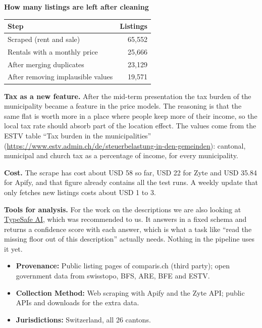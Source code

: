 \documentclass[11pt, a4paper]{article}
\begin{document}
\vspace{0.4em}
\textbf{How many listings are left after cleaning}

\vspace{0.2em}
\begin{center}
\small
\begin{tabular}{lr}
    \toprule
    Step & Listings \\
    \midrule
    Scraped (rent and sale) & 65{,}552 \\
    Rentals with a monthly price & 25{,}666 \\
    After merging duplicates & 23{,}129 \\
    After removing implausible values & 19{,}571 \\
    \bottomrule
\end{tabular}
\end{center}

\vspace{0.4em}
\textbf{Tax as a new feature.} After the mid-term presentation the tax burden of the municipality became a feature in the price models. The reasoning is that the same flat is worth more in a place where people keep more of their income, so the local tax rate should absorb part of the location effect. The values come from the ESTV table ``Tax burden in the municipalities'' (\url{https://www.estv.admin.ch/de/steuerbelastung-in-den-gemeinden}): cantonal, municipal and church tax as a percentage of income, for every municipality.

\vspace{0.4em}
\textbf{Cost.} The scrape has cost about USD 58 so far, USD 22 for Zyte and USD 35.84 for Apify, and that figure already contains all the test runs. A weekly update that only fetches new listings costs about USD 1 to 3.

\vspace{0.4em}
\textbf{Tools for analysis.} For the work on the descriptions we are also looking at \href{https://console.typesafe.ai}{TypeSafe AI}, which was recommended to us. It answers in a fixed schema and returns a confidence score with each answer, which is what a task like ``read the missing floor out of this description'' actually needs. Nothing in the pipeline uses it yet.

\begin{itemize}
    \item \textbf{Provenance:} Public listing pages of comparis.ch (third party); open government data from swisstopo, BFS, ARE, BFE and ESTV.
    \item \textbf{Collection Method:} Web scraping with Apify and the Zyte API; public APIs and downloads for the extra data.
    \item \textbf{Jurisdictions:} Switzerland, all 26 cantons.
\end{itemize}
\end{document}
